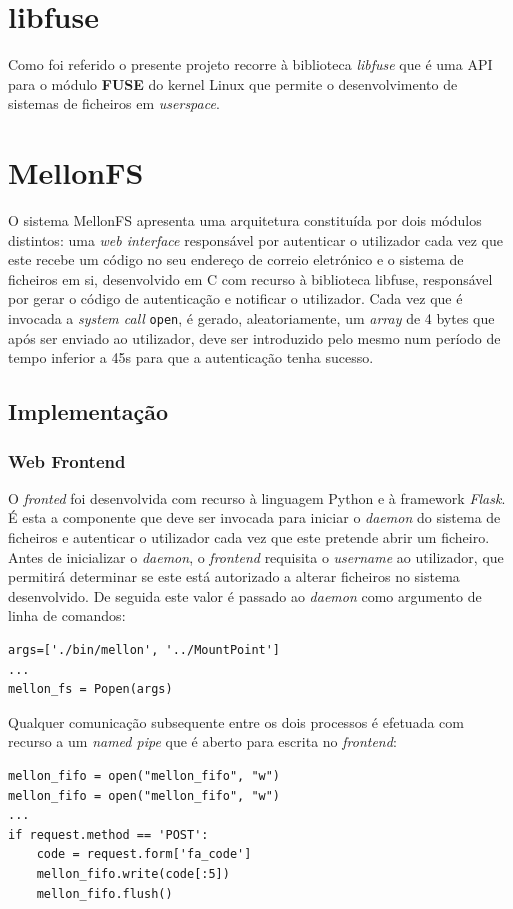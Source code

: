\documentclass{article}
\begin{document}
\section{libfuse}
Como foi referido o presente projeto recorre à biblioteca \textit{libfuse} que é uma API para o módulo \textbf{FUSE} do kernel Linux que permite o 
desenvolvimento de sistemas de ficheiros em \textit{userspace}.

\section{MellonFS}
O sistema MellonFS apresenta uma arquitetura constituída por dois módulos distintos: uma \textit{web interface} responsável por autenticar o utilizador cada 
vez que este recebe um código no seu endereço de correio eletrónico e o sistema de ficheiros em si, desenvolvido em C com recurso à biblioteca libfuse, 
responsável por gerar o código de autenticação e notificar o utilizador. Cada vez que é invocada a \textit{system call} \texttt{open}, é gerado, aleatoriamente, 
um \textit{array} de 4 bytes que após ser enviado ao utilizador, deve ser introduzido pelo mesmo num período de tempo inferior a 45s para que a autenticação 
tenha sucesso.

\subsection{Implementação}
\subsubsection{Web Frontend}
O \textit{fronted} foi desenvolvida com recurso à linguagem Python e à framework \textit{Flask}.
É esta a componente que deve ser invocada para iniciar o \textit{daemon} do sistema de ficheiros e autenticar o utilizador cada vez que este pretende abrir um 
ficheiro. Antes de inicializar o \textit{daemon}, o \textit{frontend} requisita o \textit{username} ao utilizador, que permitirá determinar se este está 
autorizado a alterar ficheiros no sistema desenvolvido. De seguida este valor é passado ao \textit{daemon} como argumento de linha de comandos:
\begin{Verbatim}
args=['./bin/mellon', '../MountPoint']
...
mellon_fs = Popen(args)
\end{Verbatim}
Qualquer comunicação subsequente entre os dois processos é efetuada com recurso a um \textit{named pipe} que é aberto para escrita no \textit{frontend}:
\begin{Verbatim}
mellon_fifo = open("mellon_fifo", "w")
mellon_fifo = open("mellon_fifo", "w")
...
if request.method == 'POST':
    code = request.form['fa_code']
    mellon_fifo.write(code[:5])
    mellon_fifo.flush()
\end{Verbatim}
\end{document}
